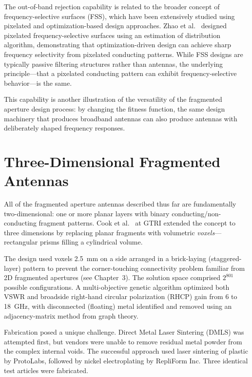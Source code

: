 The out-of-band rejection capability is related to the broader concept of frequency-selective surfaces (FSS), which have been extensively studied using pixelated and optimization-based design approaches.  Zhao et al.\ \cite{Zhao2015Novel} designed pixelated frequency-selective surfaces using an estimation of distribution algorithm, demonstrating that optimization-driven design can achieve sharp frequency selectivity from pixelated conducting patterns.  While FSS designs are typically passive filtering structures rather than antennas, the underlying principle---that a pixelated conducting pattern can exhibit frequency-selective behavior---is the same.

This capability is another illustration of the versatility of the fragmented aperture design process: by changing the fitness function, the same design machinery that produces broadband antennas can also produce antennas with deliberately shaped frequency responses.

\section{Three-Dimensional Fragmented Antennas}
\label{sec:ch4_3d}

All of the fragmented aperture antennas described thus far are fundamentally two-dimensional: one or more planar layers with binary conducting/non-conducting fragment patterns.  Cook et al.\ \cite{Cook2019Printed} at GTRI extended the concept to three dimensions by replacing planar fragments with volumetric \emph{voxels}---rectangular prisms filling a cylindrical volume.

The design used voxels 2.5~mm on a side arranged in a brick-laying (staggered-layer) pattern to prevent the corner-touching connectivity problem familiar from 2D fragmented apertures (see Chapter~3).  The solution space comprised $2^{801}$ possible configurations.  A multi-objective genetic algorithm optimized both VSWR and broadside right-hand circular polarization (RHCP) gain from 6 to 18~GHz, with disconnected (floating) metal identified and removed using an adjacency-matrix method from graph theory.

Fabrication posed a unique challenge.  Direct Metal Laser Sintering (DMLS) was attempted first, but vendors were unable to remove residual metal powder from the complex internal voids.  The successful approach used laser sintering of plastic by ProtoLabs, followed by nickel electroplating by RepliForm Inc.  Three identical test articles were fabricated.

